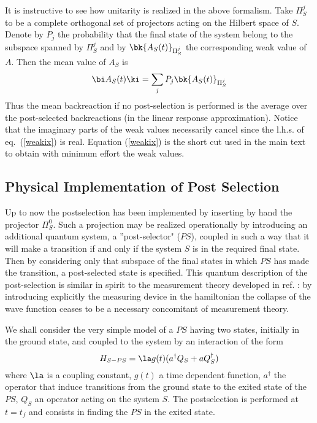 \documentclass[12pt]{article}
\begin{document}
It is instructive to see how unitarity is realized in the above formalism.
Take
 $\Pi^j_S$
to be  a
complete orthogonal set of projectors acting on the
Hilbert space of $S$. Denote by $P_j$ the probability that
the final state of the system belong to the subspace spanned by $\Pi^j_S$ and
by $\bk{A_{S}(t)}_{\Pi^j_S} $ the corresponding weak
value of $A$. Then the mean value of
$A_S$ is  \begin{equation} \bi A_S(t) \ki =
\sum_j P_j \bk{A_{S}(t)}_{\Pi^j_S}
  \label{weakix}
\end{equation}
Thus the mean
backreaction if no post-selection is performed is the average over the
post-selected backreactions (in the linear response approximation).
Notice that the imaginary parts of the weak
values necessarily cancel since the l.h.s. of eq.~(\ref{weakix}) is
real. Equation (\ref{weakix}) is the short cut used in the main text to
obtain with minimum effort the weak values.

\subsection{Physical Implementation of Post Selection}

Up to now the postselection has been implemented by
inserting by hand
the projector $\Pi^0_S$.
Such a projection may be
realized operationally by introducing
an additional
quantum
system, a ''post-selector" ($PS$),
coupled in such a way
 that it will make a transition if and only if the system $S$
is in the required final state. Then by considering
only that subspace of the
final states in which $PS$ has made the
transition, a post-selected state is specified. This
quantum description of the
post-selection
is similar in spirit to the measurement theory developed in ref.
\cite{Vonn}: by introducing explicitly the measuring device in the
hamiltonian the collapse of the wave function ceases to be a necessary
concomitant of measurement theory.

We shall consider the very simple model of a $PS$ having two states,
initially in the ground state, and coupled to the system by an interaction
of the form \begin{equation}
H_{S-PS} = \la g(t) ( a^\dagger Q_S + a Q_S^\dagger)
\label{weakx}
\end{equation}
where $\la$ is a
coupling constant, $g(t)$ a time dependent function, $a^\dagger$  the operator
that induce transitions from the ground state to the exited state of the
$PS$, $Q_S$ an operator acting on the system $S$. The
postselection is performed at $t=t_f$ and consists in finding the $PS$ in the
exited state.
\end{document}
